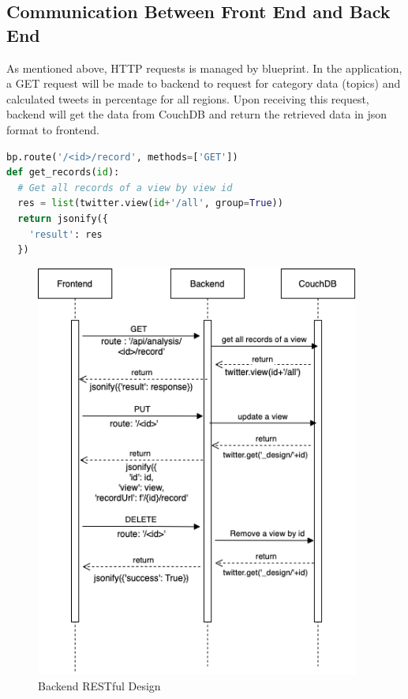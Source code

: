 \documentclass[parskip=full, 11pt]{article}
\begin{document}
\subsection{Communication Between Front End and Back End}
As mentioned above, HTTP requests is managed by blueprint. In the application, a GET request will be made to backend to request for category data (topics) and calculated tweets in percentage for all regions. Upon receiving this request, backend will get the data from CouchDB and return the retrieved data in json format to frontend.

\begin{lstlisting}[language=Python]
bp.route('/<id>/record', methods=['GET'])
def get_records(id):
  # Get all records of a view by view id
  res = list(twitter.view(id+'/all', group=True))
  return jsonify({
    'result': res
  })
\end{lstlisting}

\begin{figure}[H]
    \centering
    \includegraphics[width=0.95\textwidth]{Figures/BackendRESTful.png}
    \caption{Backend RESTful Design}
    \label{fig:my_label}
\end{figure}
\end{document}
